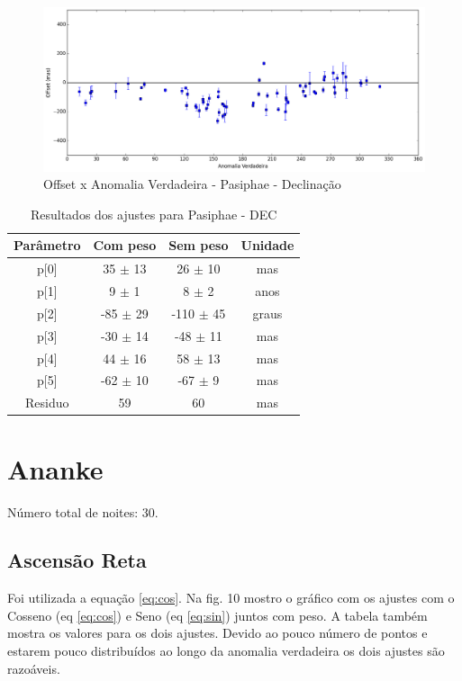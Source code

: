 \documentclass[11pt,a4paper]{report}
\begin{document}
\begin{figure}[h]
\caption{Offset x Anomalia Verdadeira - Pasiphae - Declinação}
\includegraphics[scale=0.45]{Pasiphae/DEC_anom.png}  
\end{figure}

\begin{table}[h!]
\caption{\label{Tab: Pasiphae-DEC} Resultados dos ajustes para Pasiphae - DEC}
\begin{centering}
\begin{tabular}{cccc}
\hline
\hline
Parâmetro & Com peso & Sem peso & Unidade\tabularnewline
\hline
p[0] & 35 $\pm$ 13 & 26 $\pm$ 10 & mas\\
p[1] & 9 $\pm$ 1 & 8 $\pm$ 2 & anos\\
p[2] & -85 $\pm$ 29 & -110 $\pm$ 45 & graus\\
p[3] & -30 $\pm$ 14 & -48 $\pm$ 11 & mas\\
p[4] & 44 $\pm$ 16 & 58 $\pm$ 13 & mas\\
p[5] & -62 $\pm$ 10 & -67 $\pm$ 9 & mas\\
Residuo & 59 & 60 & mas\\
\hline 
\end{tabular} 
\par\end{centering}
\end{table}

\chapter*{Ananke}

\indent \indent Número total de noites: 30.

\section*{Ascensão Reta}

\indent \indent Foi utilizada a equação \ref{eq:cos}. Na fig. 10 mostro o gráfico com os ajustes com o Cosseno (eq \ref{eq:cos}) e Seno (eq \ref{eq:sin}) juntos com peso. A tabela também mostra os valores para os dois ajustes. Devido ao pouco número de pontos e estarem pouco distribuídos ao longo da anomalia verdadeira os dois ajustes são razoáveis.
\end{document}
